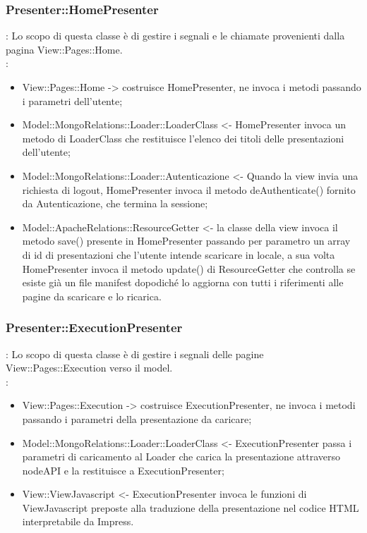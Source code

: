 {	\subsubsection{Presenter::HomePresenter}{
				\textbf{\tipo}: Lo scopo di questa classe è di gestire i segnali e le chiamate provenienti dalla pagina View::Pages::Home.\\	
				\textbf{\relaz}:
				\begin{itemize}
					\item View::Pages::Home -> costruisce HomePresenter, ne invoca i metodi passando i parametri dell’utente;
					\item Model::MongoRelations::Loader::LoaderClass <- HomePresenter invoca un metodo di LoaderClass che restituisce l’elenco dei titoli delle presentazioni dell’utente;
					\item Model::MongoRelations::Loader::Autenticazione <- Quando la view invia una richiesta di logout, HomePresenter invoca il metodo deAuthenticate() fornito da Autenticazione, che termina la sessione;
					\item Model::ApacheRelations::ResourceGetter <- la classe della view invoca il metodo save() presente in  HomePresenter passando per parametro un array di id di presentazioni che l'utente intende scaricare in locale, a sua volta HomePresenter invoca il metodo update() di ResourceGetter che controlla se esiste già un file manifest dopodiché lo aggiorna con tutti i riferimenti alle pagine da scaricare e lo ricarica. 					
				\end{itemize} 
			}
		\subsubsection{Presenter::ExecutionPresenter}{
				\textbf{\tipo}: Lo scopo di questa classe è di gestire i segnali delle pagine View::Pages::Execution verso il model.\\	
				\textbf{\relaz}:
					\begin{itemize}
						\item View::Pages::Execution -> costruisce ExecutionPresenter, ne invoca i metodi passando i parametri della presentazione da caricare;
						\item Model::MongoRelations::Loader::LoaderClass <- ExecutionPresenter passa i parametri di caricamento al Loader che carica la presentazione attraverso nodeAPI e la restituisce a ExecutionPresenter;
						\item View::ViewJavascript <- ExecutionPresenter invoca le funzioni di ViewJavascript preposte alla traduzione della presentazione nel codice HTML interpretabile da Impress.
					\end{itemize}
		}
		
}
